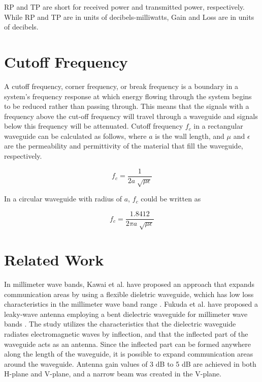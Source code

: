 \documentclass[a4paper,11pt]{jsarticle}
\begin{document}
RP and TP are short for received power and transmitted power, respectively.
While RP and TP are in units of decibels-milliwatts, Gain and Loss are in units of decibels.

\section{Cutoff Frequency}

A cutoff frequency, corner frequency, or break frequency
is a boundary in a system's frequency response at which
energy flowing through the system begins to be reduced
rather than passing through.
This means that the signals with a frequency above the cut-off frequency
will travel through a waveguide and signals below this frequency
will be attenuated.
Cutoff frequency $f_c$ in a rectangular waveguide can be calculated as follows,
where $a$ is the wall length, and $\mu$ and $\epsilon$ are
the permeability and permittivity of the material
that fill the waveguide, respectively.

\begin{equation}
  f_c = \frac{1}{2a\sqrt[]{\mu\epsilon}}
\end{equation}

In a circular waveguide with radius of $a$,
$f_c$ could be written as

\begin{equation}
  f_c = \frac{1.8412}{2\pi a\sqrt[]{\mu\epsilon}}
\end{equation}

\section{Related Work}

In millimeter wave bands, Kawai et al. have proposed an approach that expands
communication areas by using a flexible dieletric waveguide,
wchich has low loss characteristics in the millimeter wave band range \cite{new_area_formation_approach}.
Fukuda et al. have proposed a leaky-wave antenna employing a bent dielectric waveguide for
millimeter wave bands \cite{leaky_wave_antenna_bent_dielectric}.
The study utilizes the characteristics that the
dielectric waveguide radiates electromagnetic waves by
inflection, and that the inflected part of the waveguide acts as
an antenna.
Since
the inflected part can be formed anywhere along the length of
the waveguide, it is possible to expand communication areas
around the waveguide. 
Antenna gain values of 3 dB to 5 dB are
achieved in both H-plane and V-plane,
and a narrow beam was created in the V-plane.
\end{document}
